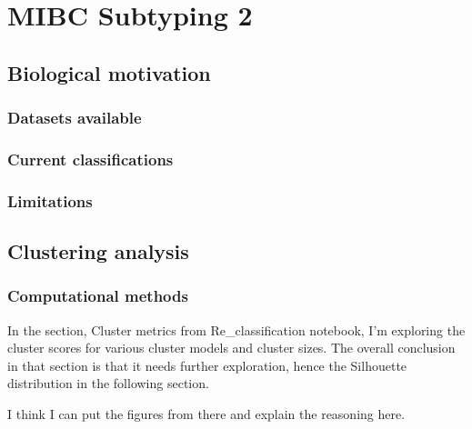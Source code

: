\section{MIBC Subtyping 2}

\subsection{Biological motivation}
\subsubsection{Datasets available}
\subsubsection{Current classifications}
\subsubsection{Limitations}

\subsection{Clustering analysis}

\subsubsection{Computational methods}

In the section, Cluster metrics from Re\_classification notebook, I'm exploring the cluster scores for various cluster models and cluster sizes. The overall conclusion in that section is that it needs further exploration, hence the Silhouette distribution in the following section.

I think I can put the figures from there and explain the reasoning here.

